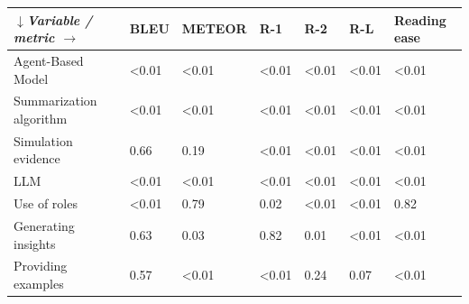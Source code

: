 \begin{tabular}{|l|l|l|l|l|l|l|}
\hline
\textit{$\downarrow$Variable / metric $\rightarrow$} & BLEU & METEOR & R-1 & R-2 & R-L & Reading ease \\
 \hline
 Agent-Based Model & \textless{}0.01 & \textless{}0.01 & \textless{}0.01 & \textless{}0.01 & \textless{}0.01 & \textless{}0.01 \\
 \hline
 Summarization algorithm & \textless{}0.01 & \textless{}0.01 & \textless{}0.01 & \textless{}0.01 & \textless{}0.01 & \textless{}0.01 \\
 \hline
 Simulation evidence & 0.66 & 0.19 & \textless{}0.01 & \textless{}0.01 & \textless{}0.01 & \textless{}0.01 \\
 \hline
 LLM & \textless{}0.01 & \textless{}0.01 & \textless{}0.01 & \textless{}0.01 & \textless{}0.01 & \textless{}0.01 \\
 \hline
 Use of roles & \textless{}0.01 & 0.79 & 0.02 & \textless{}0.01 & \textless{}0.01 & 0.82 \\
 \hline
 Generating insights & 0.63 & 0.03 & 0.82 & 0.01 & \textless{}0.01 & \textless{}0.01 \\
 \hline
 Providing examples & 0.57 & \textless{}0.01 & \textless{}0.01 & 0.24 & 0.07 & \textless{}0.01 \\
\hline
\end{tabular}
